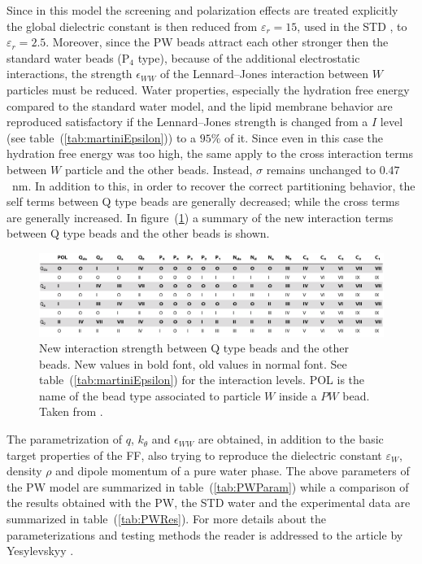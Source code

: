 Since in this model the screening and polarization effects are treated explicitly the global dielectric constant
is then reduced from $\varepsilon_r = 15$, used in the \ac{STD} \martini, to $\varepsilon_r = 2.5$. Moreover,
since the \ac{PW} beads attract each other stronger then the standard water beads (P$_4$ type), because of the additional electrostatic interactions, the strength $\epsilon_{WW}$ of the Lennard--Jones interaction between $W$ particles must be reduced. Water properties, especially the hydration free energy compared to the standard water model, and the lipid membrane behavior are reproduced satisfactory if the Lennard--Jones strength is changed from a
$I$ level (see table~(\ref{tab:martiniEpsilon})) to a $95\% $ of it. Since even in this case the hydration free energy was too high, the same apply to the cross interaction terms between $W$ particle and the other \martini beads. Instead, $\sigma$ remains unchanged to $0.47$~nm. In addition to this, in order to recover the correct partitioning behavior, the self terms between Q type beads are generally decreased; while the cross terms are generally increased. In figure~(\ref{fig:PWMartini}) a summary of the new interaction terms between Q type beads and the other beads is shown.
\begin{figure}[!ht]
	\centering
	\includegraphics[width=\textwidth]{./img/PWMartini}
	\caption{New interaction strength between Q type beads and the other beads. New values in bold font, old values in normal font. See table~(\ref{tab:martiniEpsilon}) for the interaction levels. POL is the name of the \martini bead type associated to particle $W$ inside a $PW$ bead. Taken from \cite{PW}.}
	\label{fig:PWMartini}
\end{figure}

The parametrization of $q$, $k_\theta$ and $\epsilon_{WW}$ are obtained, in addition to the basic target
properties of the \martini \ac{FF}, also trying to reproduce the dielectric constant $\varepsilon_{W}$, density
$\rho$ and dipole momentum of a pure water phase. The above parameters of the \ac{PW} model are summarized in
table~(\ref{tab:PWParam}) while a comparison of the results obtained with the \ac{PW}, the \ac{STD} \martini
water and the experimental data are summarized in table~(\ref{tab:PWRes}). For more details about the
parameterizations and testing methods the reader is
addressed to the article by Yesylevskyy \etal\cite{PW}.

